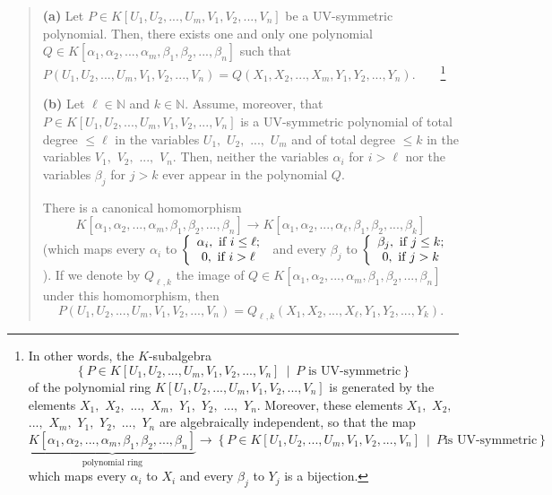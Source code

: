 \documentclass[numbers=enddot,12pt,final,onecolumn,notitlepage]{scrartcl}%
\begin{document}
\begin{quote}
\textbf{(a)} Let $P\in K\left[  U_{1},U_{2},...,U_{m},V_{1},V_{2}%
,...,V_{n}\right]  $ be a UV-symmetric polynomial. Then, there exists one and
only one polynomial $Q\in K\left[  \alpha_{1},\alpha_{2},...,\alpha_{m}%
,\beta_{1},\beta_{2},...,\beta_{n}\right]  $ such that $P\left(  U_{1}%
,U_{2},...,U_{m},V_{1},V_{2},...,V_{n}\right)  =Q\left(  X_{1},X_{2}%
,...,X_{m},Y_{1},Y_{2},...,Y_{n}\right)  $.\ \ \ \ \footnote{In other words,
the $K$-subalgebra%
\[
\left\{  P\in K\left[  U_{1},U_{2},...,U_{m},V_{1},V_{2},...,V_{n}\right]
\ \mid\ P\text{ is UV-symmetric}\right\}
\]
of the polynomial ring $K\left[  U_{1},U_{2},...,U_{m},V_{1},V_{2}%
,...,V_{n}\right]  $ is generated by the elements $X_{1},$ $X_{2},$ $...,$
$X_{m},$ $Y_{1},$ $Y_{2},$ $...,$ $Y_{n}$. Moreover, these elements $X_{1},$
$X_{2},$ $...,$ $X_{m},$ $Y_{1},$ $Y_{2},$ $...,$ $Y_{n}$ are algebraically
independent, so that the map%
\[
\underbrace{K\left[  \alpha_{1},\alpha_{2},...,\alpha_{m},\beta_{1},\beta
_{2},...,\beta_{n}\right]  }_{\text{polynomial ring}}\rightarrow\left\{  P\in
K\left[  U_{1},U_{2},...,U_{m},V_{1},V_{2},...,V_{n}\right]  \ \mid\ P\text{
is UV-symmetric}\right\}
\]
which maps every $\alpha_{i}$ to $X_{i}$ and every $\beta_{j}$ to $Y_{j}$ is a
bijection.}

\textbf{(b)} Let $\ell\in\mathbb{N}$ and $k\in\mathbb{N}$. Assume, moreover,
that $P\in K\left[  U_{1},U_{2},...,U_{m},V_{1},V_{2},...,V_{n}\right]  $ is a
UV-symmetric polynomial of total degree $\leq\ell$ in the variables $U_{1},$
$U_{2},$ $...,$ $U_{m}$ and of total degree $\leq k$ in the variables $V_{1},$
$V_{2},$ $...,$ $V_{n}.$ Then, neither the variables $\alpha_{i}$ for $i>\ell$
nor the variables $\beta_{j}$ for $j>k$ ever appear in the polynomial $Q$.

There is a canonical homomorphism%
\[
K\left[  \alpha_{1},\alpha_{2},...,\alpha_{m},\beta_{1},\beta_{2}%
,...,\beta_{n}\right]  \rightarrow K\left[  \alpha_{1},\alpha_{2}%
,...,\alpha_{\ell},\beta_{1},\beta_{2},...,\beta_{k}\right]
\]
(which maps every $\alpha_{i}$ to $\left\{
\begin{array}
[c]{c}%
\alpha_{i},\text{ if }i\leq\ell;\\
0,\text{ if }i>\ell
\end{array}
\right.  $ and every $\beta_{j}$ to $\left\{
\begin{array}
[c]{c}%
\beta_{j},\text{ if }j\leq k;\\
0,\text{ if }j>k
\end{array}
\right.  $). If we denote by $Q_{\ell,k}$ the image of $Q\in K\left[
\alpha_{1},\alpha_{2},...,\alpha_{m},\beta_{1},\beta_{2},...,\beta_{n}\right]
$ under this homomorphism, then%
\[
P\left(  U_{1},U_{2},...,U_{m},V_{1},V_{2},...,V_{n}\right)  =Q_{\ell
,k}\left(  X_{1},X_{2},...,X_{\ell},Y_{1},Y_{2},...,Y_{k}\right)  .
\]



\end{quote}
\end{document}
